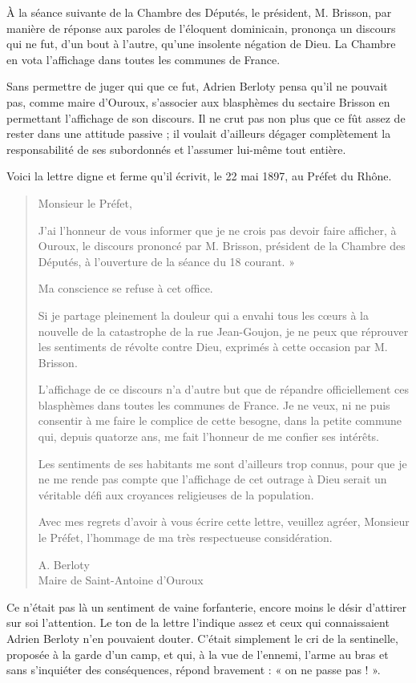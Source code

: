 À la séance suivante de la Chambre des Députés, le président, M. Brisson, par manière de réponse aux paroles de l'éloquent dominicain, prononça un discours qui ne fut, d'un bout à l'autre, qu'une insolente négation de Dieu. La Chambre en vota l'affichage dans toutes les communes de France.

Sans permettre de juger qui que ce fut, Adrien Berloty pensa qu'il ne pouvait pas, comme maire d'Ouroux, s'associer aux blasphèmes du sectaire Brisson en permettant l'affichage de son discours. Il ne crut pas non plus que ce fût assez de rester dans une attitude passive ; il voulait d'ailleurs dégager complètement la responsabilité de ses subordonnés et l'assumer lui-même tout entière.

Voici la lettre digne et ferme qu'il écrivit, le 22 mai 1897, au Préfet du Rhône.

\begin{quote}
Monsieur le Préfet,

J'ai l'honneur de vous informer que je ne crois pas devoir faire afficher, à Ouroux, le discours prononcé par M. Brisson, président de la Chambre des Députés, à l'ouverture de la séance du 18 courant. »

Ma conscience se refuse à cet office.

Si je partage pleinement la douleur qui a envahi tous les cœurs à la nouvelle de la catastrophe de la rue Jean-Goujon, je ne peux que réprouver les sentiments de révolte contre Dieu, exprimés à cette occasion par M. Brisson.

L'affichage de ce discours n'a d'autre but que de répandre officiellement ces blasphèmes dans toutes les communes de France. Je ne veux, ni ne puis consentir à me faire le complice de cette besogne, dans la petite commune qui, depuis quatorze ans, me fait l'honneur de me confier ses intérêts.

Les sentiments de ses habitants me sont d'ailleurs trop connus, pour que je ne me rende pas compte que l'affichage de cet outrage à Dieu serait un véritable défi aux croyances religieuses de la population.

Avec mes regrets d'avoir à vous écrire cette lettre, veuillez agréer, Monsieur le Préfet, l'hommage de ma très respectueuse considération.

A. Berloty  \\
Maire de Saint-Antoine d'Ouroux
\end{quote}

Ce n'était pas là un sentiment de vaine forfanterie, encore moins le désir d'attirer sur soi l'attention. Le ton de la lettre l'indique assez et ceux qui connaissaient Adrien Berloty n'en pouvaient douter. C'était simplement le cri de la sentinelle, proposée à la garde d'un camp, et qui, à la vue de l'ennemi, l'arme au bras et sans s'inquiéter des conséquences, répond bravement : « on ne passe pas ! ».

